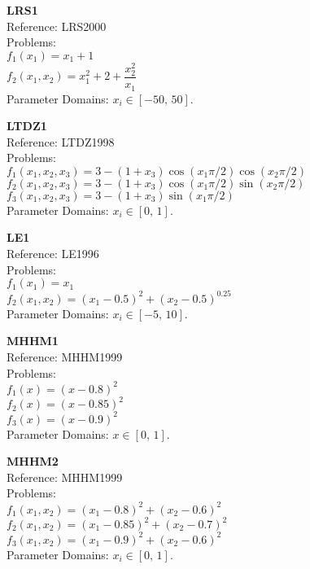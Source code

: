 \documentclass[12pt,a4paper]{article}
\begin{document}
\medskip

\textbf{LRS1}\\
Reference: LRS2000\\
Problems:\\
$f_1(x_1) = x_1 + 1$\\
$f_2(x_1,x_2) = x_1^2 + 2 + \dfrac{x_2^2}{x_1}$\\
Parameter Domains: $x_i \in [-50,\,50]$.

\medskip

\textbf{LTDZ1}\\
Reference: LTDZ1998\\
Problems:\\
 $f_1(x_1,x_2,x_3) = 3 - (1+x_3)\cos(x_1\pi/2)\cos(x_2\pi/2)$\\
 $f_2(x_1,x_2,x_3) = 3 - (1+x_3)\cos(x_1\pi/2)\sin(x_2\pi/2)$\\
 $f_3(x_1,x_2,x_3) = 3 - (1+x_3)\sin(x_1\pi/2)$\\
Parameter Domains: $x_i \in [0,\,1]$.

\medskip

\textbf{LE1}\\
Reference: LE1996\\
Problems:\\
$f_1(x_1) = x_1$\\
$f_2(x_1,x_2) = (x_1-0.5)^2 + (x_2 - 0.5)^{0.25}$\\
Parameter Domains: $x_i \in [-5,\,10]$.

\medskip

\textbf{MHHM1}\\
Reference: MHHM1999\\
Problems:\\
$f_1(x) = (x-0.8)^2$\\
$f_2(x) = (x-0.85)^2$\\
$f_3(x) = (x-0.9)^2$\\
Parameter Domains: $x \in [0,\,1]$.

\medskip

\textbf{MHHM2}\\
Reference: MHHM1999\\
Problems:\\
$f_1(x_1,x_2) = (x_1-0.8)^2 + (x_2-0.6)^2$\\
$f_2(x_1,x_2) = (x_1-0.85)^2 + (x_2-0.7)^2$\\
$f_3(x_1,x_2) = (x_1-0.9)^2 + (x_2-0.6)^2$\\
Parameter Domains: $x_i \in [0,\,1]$.

\medskip
\end{document}

